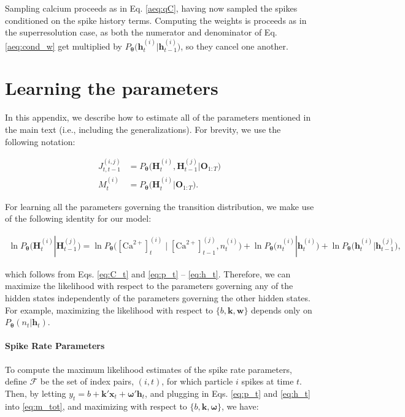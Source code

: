 \documentclass[10pt]{article}
\providecommand{\ve}[1]{\boldsymbol{#1}}
\providecommand{\ve}[1]{\boldsymbol{#1}}
\newcommand{\thetn}{\ve{\theta}}
\newcommand{\p}{P_{\thetn}}
\newcommand{\Ca}{[\text{Ca}^{2+}]}
\begin{document}
Sampling calcium proceeds as in Eq. \ref{aeq:qC}, having now sampled the spikes conditioned on the spike history terms.  Computing the weights is proceeds as in the superresolution case, as both the numerator and denominator of Eq. \ref{aeq:cond_w} get multiplied by $\p\big(\ve{h}_t^{(i)} | \ve{h}_{t-1}^{(i)}\big)$, so they cancel one another.

\section{Learning the parameters} \label{sec:mstep}

In this appendix, we describe how to estimate all of the parameters mentioned in the main text (i.e., including the generalizations).  For brevity, we use the following notation:

\begin{align*}
J_{t,t-1}^{(i,j)} &= \p\big(\ve{H}_t^{(i)}, \ve{H}_{t-1}^{(j)} | \ve{O}_{1:T}\big) \\
M_{t}^{(i)} &= \p\big(\ve{H}_t^{(i)} | \ve{O}_{1:T}\big). 
\end{align*}

\noindent For learning all the parameters governing the transition distribution, we make use of the following identity for our model:

\begin{multline}
\ln \p\big(\ve{H}_t^{(i)} | \ve{H}_{t-1}^{(j)}\big) =
\ln \p\big(\Ca_t^{(i)} \mid \Ca_{t-1}^{(j)}, n_t^{(i)}\big) + \ln \p\big(n_t^{(i)} | \ve{h}_t^{(i)}\big) + \ln \p\big(\ve{h}_t^{(i)} | \ve{h}_{t-1}^{(j)}\big),
\end{multline}

\noindent which follows from Eqs. \ref{eq:C_t} and \ref{eq:p_t} -- \ref{eq:h_t}. Therefore, we can maximize the likelihood with respect to the parameters governing any of the hidden states independently of the parameters governing the other hidden states. For example, maximizing the likelihood with respect to $\{b, \ve{k}, \ve{w}\}$ depends only on $\p(n_t | \ve{h}_t)$. 

\paragraph{Spike Rate Parameters} 

To compute the maximum likelihood estimates of the spike rate parameters, define $\mathcal{F}$ be the set of index pairs, $(i,t)$, for which particle $i$ spikes at time $t$.  Then, by letting $y_t=b+\ve{k}' \ve{x}_t+ \ve{\omega}' \ve{h}_t$, and plugging in Eqs. \ref{eq:p_t} and \ref{eq:h_t} into \ref{eq:m_tot}, and maximizing with respect to $\{b, \ve{k}, \ve{\omega}\}$, we have:
\end{document}
